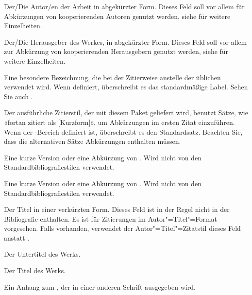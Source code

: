 \documentclass{ltxdockit}[2011/03/25]
\begin{document}
\begin{fieldlist}

Der/Die Autor/en der Arbeit in abgekürzter Form. Dieses Feld soll vor allem für
Abkürzungen von kooperierenden Autoren genutzt werden, siehe
 für weitere Einzelheiten.


Der/Die Herausgeber des Werkes, in abgekürzter Form. Dieses Feld soll vor allem
zur Abkürzung von kooperierenden Herausgebern genutzt werden, siehe
 für weitere Einzelheiten.


Eine besondere Bezeichnung, die bei der Zitierweise anstelle der üblichen
verwendet wird. Wenn
definiert, überschreibt es das standardmäßige Label.
Sehen Sie auch .


Der ausführliche Zitierstil, der mit diesem Paket geliefert wird, benutzt
Sätze,
wie «fortan zitiert als [Kurzform]», um Abkürzungen im ersten Zitat einzuführen.
Wenn der -Bereich definiert ist, überschreibt es den
Standardsatz. Beachten Sie, dass die alternativen Sätze Abkürzungen enthalten
müssen.


Eine kurze Version oder eine Abkürzung von . Wird nicht
von den Standardbibliografiestilen verwendet.


Eine kurze Version oder eine Abkürzung von . Wird nicht von den
Standardbibliografiestilen verwendet.


Der Titel in einer verkürzten Form. Dieses Feld ist in der Regel nicht in der
Bibliografie enthalten. Es ist für Zitierungen im Autor"=Titel"=Format
vorgesehen. Falls vorhanden, verwendet der Autor"=Titel"=Zitatstil dieses Feld
anstatt .


Der Untertitel des Werks.


Der Titel des Werks.


Ein Anhang zum , der in einer anderen Schrift ausgegeben wird.


\end{fieldlist}
\end{document}
